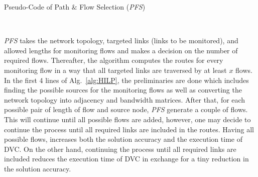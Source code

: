 \documentclass[10pt, journal, letterpaper]{IEEEtran}
\begin{document}
\begin{algorithm}[!htbp]
	\caption{Pseudo-Code of Path $\&$ Flow Selection (\textit{PFS})}
	\label{alg:HILP}
	\small
	\allowdisplaybreaks
	\begin{algorithmic}[1]
        	\EndFor
    	\EndFor\\
	\end{algorithmic}
\end{algorithm}

\textit{PFS} takes the network topology, targeted links (links to be monitored), and allowed lengths for monitoring flows and makes a decision on the number of required flows. Thereafter, the algorithm computes the routes for every monitoring flow in a way that all targeted links are traversed by at least $x$ flows. In the first 4 lines of Alg.~\ref{alg:HILP}, the preliminaries are done which includes finding the possible sources for the monitoring flows as well as converting the network topology into adjacency and bandwidth matrices. After that, for each possible pair of length of flow and source node, \textit{PFS} generate a couple of flows. This will continue until all possible flows are added, however, one may decide to continue the process until all required links are included in the routes. Having all possible flows, increases both the solution accuracy and the execution time of DVC. On the other hand, continuing the process until all required links are included reduces the execution time of DVC in exchange for a tiny reduction in the solution accuracy.
\end{document}
